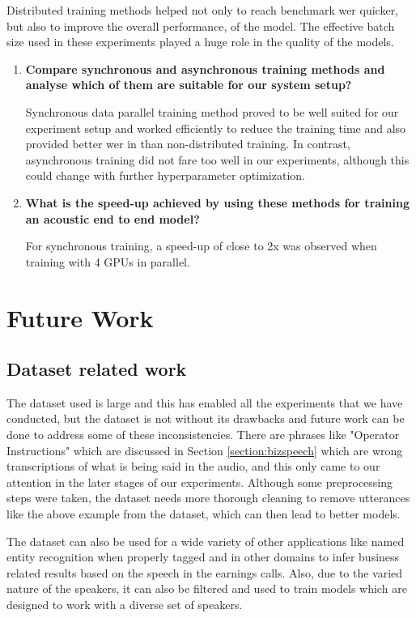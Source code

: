 \begin{enumerate}
    Distributed training methods helped not only to reach benchmark \acrshort{wer} quicker, but also to improve the overall performance, of the model. The effective batch size used in these experiments played a huge role in the quality of the models.
    
    \begin{enumerate}
        \item \textbf{Compare synchronous and asynchronous training methods and analyse which of them are suitable for our system setup?} 
        
        Synchronous data parallel training method proved to be well suited for our experiment setup and worked efficiently to reduce the training time and also provided better \acrshort{wer} in than non-distributed training. In contrast, asynchronous training did not fare too well in our experiments, although this could change with further hyperparameter optimization.
    
    
        \item \textbf{What is the speed-up achieved by using these methods for training an acoustic end to end model?}
        
        For synchronous training, a speed-up of close to 2x was observed when training with 4 GPUs in parallel.
    \end{enumerate}
\end{enumerate}

\section{Future Work}
\label{section:future}
\subsection{Dataset related work}
The dataset used is large and this has enabled all the experiments that we have conducted, but the dataset is not without its drawbacks and future work can be done to address some of these inconsistencies. There are phrases like "Operator Instructions" which are discussed in Section \ref{section:bizspeech} which are wrong transcriptions of what is being said in the audio, and this only came to our attention in the later stages of our experiments. Although some preprocessing steps were taken, the dataset needs more thorough cleaning to remove utterances like the above example from the dataset, which can then lead to better models.

The dataset can also be used for a wide variety of other applications like named entity recognition when properly tagged and in other domains to infer business related results based on the speech in the earnings calls. Also, due to the varied nature of the speakers, it can also be filtered and used to train models which are designed to work with a diverse set of speakers.  

